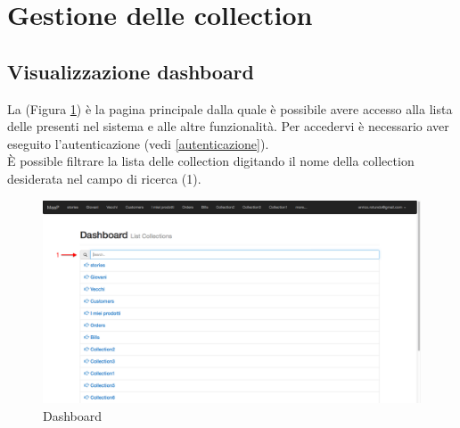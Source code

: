 \clearpage
\section{Gestione delle collection}

	\subsection{Visualizzazione dashboard} %
	\label{visualizzazionedashboard}
			La  (Figura \ref{fig:dashboard}) è la pagina principale dalla quale è possibile avere accesso alla lista delle  presenti nel sistema e alle altre funzionalità. Per accedervi è necessario aver eseguito l'autenticazione (vedi \ref{autenticazione}). \\
			\`E possible filtrare la lista delle collection digitando il nome della collection desiderata nel campo di ricerca (1).

			\begin{figure}[H]
			\label{fig:dashboard}
				\centering \includegraphics[width=1\textwidth]{img/dashboard.png}
			\caption{\label{fig:dashboard} Dashboard}
			\end{figure}
	
	\clearpage
